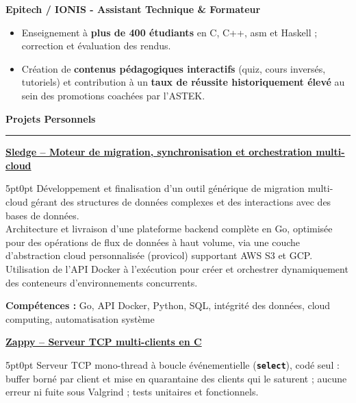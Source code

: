 \documentclass[9pt]{extarticle}
\begin{document}
\par\vspace{5pt}

{\bfseries Epitech / IONIS - Assistant Technique \& Formateur}
\begin{itemize}[noitemsep, topsep=0pt]
	\item Enseignement à {\bfseries plus de 400 étudiants} en C, C++, asm et Haskell ; correction et évaluation des rendus.
	\item Création de {\bfseries contenus pédagogiques interactifs} (quiz, cours inversés, tutoriels) et contribution à un {\bfseries taux de réussite historiquement élevé} au sein des promotions coachées par l'ASTEK.
\end{itemize}

\par\vspace{5pt}

{\large\bfseries Projets Personnels}
\par\vspace{-8pt}
\rule{\linewidth}{0.4pt}
\par\vspace{5pt}

\underline{\bfseries Sledge -- Moteur de migration, synchronisation et orchestration multi-cloud}
\par
\begin{adjustwidth}{5pt}{0pt}
    Développement et finalisation d'un outil générique de migration multi-cloud gérant des structures de données complexes et des interactions avec des bases de données. \\
    Architecture et livraison d'une plateforme backend complète en Go, optimisée pour des opérations de flux de données à haut volume, via une couche d'abstraction cloud personnalisée ({\ttfamily provicol}) supportant AWS S3 et GCP. \\
    Utilisation de l'API Docker à l'exécution pour créer et orchestrer dynamiquement des conteneurs d'environnements concurrents.
\end{adjustwidth}
\par
{\bfseries Compétences :} Go, API Docker, Python, SQL, intégrité des données, cloud computing, automatisation système

\par\vspace{8pt}

\underline{\bfseries Zappy -- Serveur TCP multi-clients en C}
\par
\begin{adjustwidth}{5pt}{0pt}
    Serveur TCP mono-thread à boucle événementielle ({\bfseries \texttt{select}}), codé seul : buffer borné par client et mise en quarantaine des clients qui le saturent ; aucune erreur ni fuite sous Valgrind ; tests unitaires et fonctionnels.
\end{adjustwidth}
\end{document}
